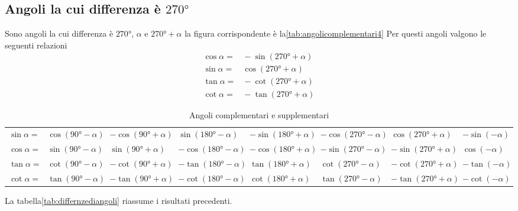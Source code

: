 \subsection{Angoli la cui differenza è $\ang{270}$}
Sono angoli la cui differenza è $\ang{270}$, $\alpha$ e $\ang{270}+\alpha$ la figura corrispondente è la\nobs\vref{tab:angolicomplementari4}
%		
Per questi angoli valgono le seguenti relazioni
\begin{align*}
\cos\alpha=&{}-\sin(\ang{270}+\alpha)\\
\sin\alpha=&{}\cos(\ang{270}+\alpha)\\
\tan\alpha=&{}-\cot(\ang{270}+\alpha)\\
\cot\alpha=&{}-\tan(\ang{270}+\alpha)
\end{align*}
\begin{table}
\centering
	\footnotesize
	\begin{tabular}{rlllllll}
	\toprule
	$\sin\alpha=$&$\cos(\ang{90}-\alpha)$&$-\cos(\ang{90}+\alpha)$&$\sin(\ang{180}-\alpha)$&$-\sin(\ang{180}+\alpha)$&$-\cos(\ang{270}-\alpha)$&$\cos(\ang{270}+\alpha)$&$-\sin(-\alpha)$\\[.6cm] 
	$\cos\alpha=$&$\sin(\ang{90}-\alpha)$&$\sin(\ang{90}+\alpha)$&$-\cos(\ang{180}-\alpha)$&$-\cos(\ang{180}+\alpha)$&$-\sin(\ang{270}-\alpha)$&$-\sin(\ang{270}+\alpha)$&$\cos(-\alpha)$\\[.6cm] 
	$\tan\alpha=$&$\cot(\ang{90}-\alpha)$&$-\cot(\ang{90}+\alpha)$&$-\tan(\ang{180}-\alpha)$&$\tan(\ang{180}+\alpha)$&$\cot(\ang{270}-\alpha)$&$-\cot(\ang{270}+\alpha)$&$-\tan(-\alpha)$\\[.6cm] 
	$\cot\alpha=$&$\tan(\ang{90}-\alpha)$&$-\tan(\ang{90}+\alpha)$&$-\cot(\ang{180}-\alpha)$&$\cot(\ang{180}+\alpha)$&$\tan(\ang{270}-\alpha)$&$-\tan(\ang{270}+\alpha)$&$-\cot(-\alpha)$\\[.6cm]
	\bottomrule
	\end{tabular}
	\caption{Angoli complementari e supplementari}\label{tab:differnzediangoli}
\end{table}
La tabella\nobs\vref{tab:differnzediangoli} riassume i risultati precedenti.
